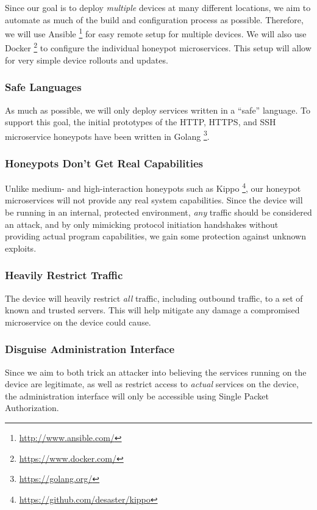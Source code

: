 Since our goal is to deploy \textit{multiple} devices at many different
locations, we aim to automate as much of the build and configuration process
as possible. Therefore, we will use Ansible
\footnote{\url{http://www.ansible.com/}} for easy remote setup for
multiple devices. We will also use Docker
\footnote{\url{https://www.docker.com/}} to configure the individual
honeypot microservices. This setup will allow for very simple device rollouts
and updates.
\subsubsection{Safe Languages}

As much as possible, we will only deploy services written in a ``safe''
language. To support this goal, the initial prototypes of the HTTP, HTTPS,
and SSH microservice honeypots have been written in Golang
\footnote{\url{https://golang.org/}}.

\subsubsection{Honeypots Don't Get Real Capabilities}

Unlike medium- and high-interaction honeypots such as Kippo
\footnote{\url{https://github.com/desaster/kippo}}, our honeypot microservices
will not provide any real system capabilities. Since the device will be
running in an internal, protected environment, \textit{any} traffic should
be considered an attack, and by only mimicking protocol initiation handshakes
without providing actual program capabilities, we gain some protection
against unknown exploits.

\subsubsection{Heavily Restrict Traffic}

The device will heavily restrict \textit{all} traffic, including outbound
traffic, to a set of known and trusted servers. This will help mitigate any
damage a compromised microservice on the device could cause.

\subsubsection{Disguise Administration Interface}

Since we aim to both trick an attacker into believing the services running
on the device are legitimate, as well as restrict access to \textit{actual}
services on the device, the administration interface will only be
accessible using Single Packet Authorization.

